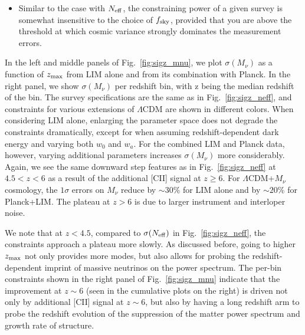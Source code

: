 \documentclass[twocolumn]{aastex631}
\begin{document}
\begin{itemize}[leftmargin=.22in,itemsep=.02in]
    \item Similar to the case with $N_{\rm eff}$, the constraining power of a given survey is somewhat insensitive to the choice of $f_{\rm sky}$, provided that you are above the threshold at which cosmic variance strongly dominates the measurement errors.
\end{itemize}

In the left and middle panels of Fig.~\ref{fig:sigz_mnu}, we plot $\sigma(M_\nu)$ as a function of $z_{\rm max}$ from LIM alone and from its combination with Planck. In the right panel, we show $\sigma(M_\nu)$ per redshift bin, with z being the median redshift of the bin. The survey specifications are the same as in Fig.~\ref{fig:sigz_neff}, and constraints for various extensions of $\Lambda$CDM are shown in different colors.  When considering LIM alone, enlarging the parameter space does not degrade the constraints dramatically, except for when assuming redshift-dependent dark energy and varying both $w_0$ and $w_a$. For the combined LIM and Planck data, however, varying additional parameters increases $\sigma(M_\nu)$ more considerably. Again, we see the same downward step features as in Fig.~\ref{fig:sigz_neff} at $ 4.5 < z < 6$ as a result of the additional [CII] signal at $z \geq 6$. For $\Lambda$CDM+$M_\nu$ cosmology, the $1\sigma$ errors on $M_\nu$ reduce by $\sim30\%$ for LIM alone and by $\sim20\%$ for Planck+LIM. The plateau at $z>6$ is due to larger instrument and interloper noise. 

We note that at $z < 4.5$, compared to $\sigma(N_{\rm eff})$ in Fig.~\ref{fig:sigz_neff}, the constraints approach a plateau more slowly. As discussed before, going to higher $z_{\rm max}$ not only provides more modes, but also allows for probing the redshift-dependent imprint of massive neutrinos on the power spectrum. The per-bin constraints shown in the right panel of Fig.~\ref{fig:sigz_mnu} indicate that the improvement at $z\sim 6$ (seen in the cumulative plots on the right) is driven not only by additional [CII] signal at $z\sim 6$, but also by having a long redshift arm to probe the redshift evolution of the suppression of the matter power spectrum and growth rate of structure.
\end{document}
